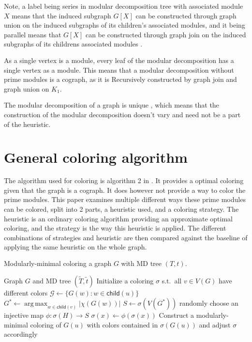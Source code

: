 \documentclass{amsart}
\newcommand{\child}{\mathsf{child}}
\DeclareMathOperator*{\argmax}{arg\,max}
\newcommand{\T}{\widetilde{T}}
\renewcommand{\t}{\widetilde{t}}
\begin{document}
Note, a label being series in modular decomposition tree with associated module
$X$ means that the induced subgraph $G[X]$ can be constructed through graph
union on the induced subgraphs of its children's associated modules, and it being
parallel means that $G[X]$ can be constructed through graph join on the
induced subgraphs of its childrens associated modules \cite{HCL}.

As a single vertex is a module, every leaf of the modular decomposition has
a single vertex as a module. This means that a modular decomposition without
prime modules is a cograph, as it is Recursively constructed by graph join and
graph union on $K_1$.

The modular decomposition of a graph is unique \cite{MDUnique}, which means that the
construction of the modular decomposition doesn't vary and need not be a part of
the heuristic.


\section{General coloring algorithm}

The algorithm used for coloring is algorithm 2 in \cite{HCL}. It provides a
optimal coloring given that the graph is a cograph. It does however not
provide a way to color the prime modules. This paper examines multiple different
ways these prime modules can be colored, split into 2 parts, a heuristic used,
and a coloring strategy. The heuristic is an ordinary coloring algorithm
providing an approximate optimal coloring, and the strategy is the way this
heuristic is applied. The different combinations of strategies and heuristic are
then compared against the baseline of applying the same heuristic on the whole
graph.

\begin{algorithm}[H]
  \caption{Modularly-minimal coloring a graph $G$ with MD tree $(T,t)$.}
  \label{alg:generic}
  \begin{algorithmic}[1]
    \REQUIRE Graph $G$ and MD tree $(\T,\t)$
    \STATE Initialize a coloring $\sigma$ s.t.\ all $v \in V(G)$
           have different colors
          \STATE $\mathcal{G} \leftarrow \{G(w)\colon w\in\child(u)\}$ 
          \STATE $G^* \leftarrow \argmax_{w\in\child(v)} |\chi(G(w))|$
          \STATE $S \leftarrow \sigma(V(G^*))$ 
             \STATE randomly choose an injective map $\phi:\sigma(H)\to S$
                \STATE $\sigma(x)\leftarrow \phi(\sigma(x))$  
             \ENDFOR
          \ENDFOR
          \STATE Construct a modularly-minimal coloring of $G(u)$
              with colors contained in $\sigma(G(u))$
              and adjust $\sigma$ accordingly 
       \ENDIF
    \ENDFOR
  \end{algorithmic}
\end{algorithm}
\end{document}
